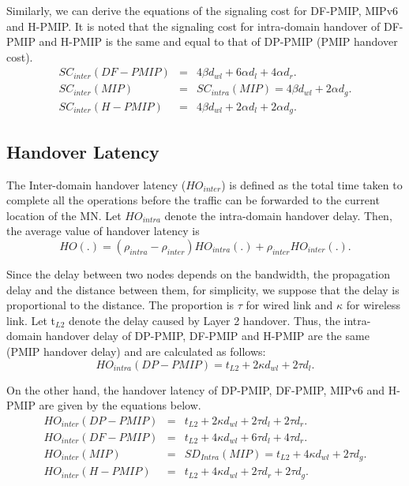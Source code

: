 Similarly, we can derive the equations of the signaling cost for DF-PMIP, MIPv6 and H-PMIP. It is noted that the signaling cost for intra-domain handover of DF-PMIP and H-PMIP is the same and equal to that of DP-PMIP (PMIP handover cost). \\
\setlength{\arraycolsep}{1.0em}
\begin{eqnarray}
SC_{inter}(DF-PMIP)&{} ={}& 4\beta d_{wl} + 6\alpha d_{l} +4\alpha d_{r}. \\
SC_{inter}(MIP)&{} ={}& SC_{intra}(MIP) = 4 \beta d_{wl} + 2\alpha d_{g}. \\
SC_{inter}(H-PMIP)&{} ={}& 4\beta d_{wl} + 2\alpha d_{l} +2\alpha d_{g}.
\end{eqnarray}

\subsection{Handover Latency}
The Inter-domain handover latency ($HO_{inter}$) is defined as the total time taken to complete all the operations before the traffic can be forwarded to the current location of the MN. Let $HO_{intra}$ denote the intra-domain handover delay. Then, the average value of handover latency is
\begin{equation}
\label{DP-PMIP}
HO(.)  = \left( \rho_{intra} - \rho_{inter} \right) HO_{intra}(.) + \rho_{inter} HO_{inter}(.).
\end{equation}

Since the delay between two nodes depends on the bandwidth, the propagation delay and the distance between them, for simplicity, we suppose that the delay is proportional to the distance. The proportion is $ \tau$ for wired link and $\kappa$ for wireless link. 
Let t$_{L2}$ denote the delay caused by Layer 2 handover. Thus, the intra-domain handover delay of DP-PMIP, DF-PMIP and H-PMIP are the same (PMIP handover delay) and are calculated as follows:\\
\begin{equation}
\label{DP-PMIP-intra}
HO_{intra}(DP-PMIP) = t_{L2} + 2\kappa d_{wl} + 2\tau d_{l}. 
\end{equation}

On the other hand, the handover latency of DP-PMIP, DF-PMIP, MIPv6 and H-PMIP are given by the equations below.\\
\setlength{\arraycolsep}{0.0em}
\begin{eqnarray}
HO_{inter}(DP-PMIP)&{} ={}& t_{L2} + 2 \kappa d_{wl} + 2\tau d_{l} + 2\tau d_{r}. \\
HO_{inter}(DF-PMIP)&{} ={}& t_{L2} + 4 \kappa d_{wl} + 6\tau d_{l}+ 4\tau d_{r}. \\
HO_{inter}(MIP)&{} ={}& SD_{Intra}(MIP) = t_{L2} + 4\kappa d_{wl} + 2\tau d_{g}. \\
HO_{inter}(H-PMIP)&{} ={}& t_{L2} + 4\kappa d_{wl} + 2\tau d_{r} + 2\tau d_{g}. 
\end{eqnarray}
